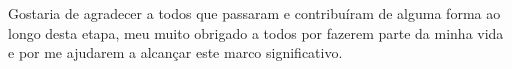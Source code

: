\documentclass[ppgc, diss, english]{iiufrgs}
\begin{document}
Gostaria de agradecer a todos que passaram e contribuíram de alguma forma ao longo desta etapa, meu muito obrigado a todos por fazerem parte da minha vida e por me ajudarem a alcançar este marco significativo.












\begin{abstract}



\end{abstract}
\end{document}
